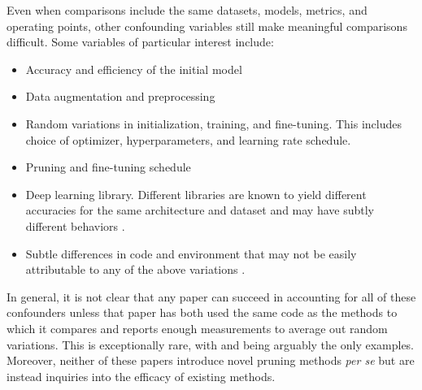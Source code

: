 Even when comparisons include the same datasets, models, metrics, and operating points, other confounding variables still make meaningful comparisons difficult. Some variables of particular interest include:
\begin{itemize}[leftmargin=4mm]
    \itemsep2pt
    \vspace{-3.5mm}
    \item Accuracy and efficiency of the initial model
    \item Data augmentation and preprocessing
    \item Random variations in initialization, training, and fine-tuning. This includes choice of optimizer, hyperparameters, and learning rate schedule.
    \item Pruning and fine-tuning schedule
    \item Deep learning library. Different libraries are known to yield different accuracies for the same architecture and dataset \cite{unreproducibleCurtis, unreproducible3} and may have subtly different behaviors \cite{kerasBnWeird}.
    \item Subtle differences in code and environment that may not be easily attributable to any of the above variations \cite{unreproducible0, unreproducible1, unreproducible4}.
\end{itemize}

In general, it is not clear that any paper can succeed in accounting for all of these confounders unless that paper has both used the same code as the methods to which it compares and reports enough measurements to average out random variations. This is exceptionally rare, with \citet{google-state-of-sparsity} and \citet{rethinking-net-pruning} being arguably the only examples. Moreover, neither of these papers introduce novel pruning methods \textit{per se} but are instead inquiries into the efficacy of existing methods.

